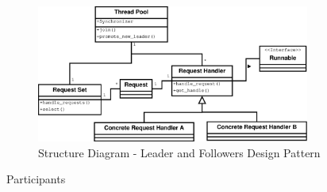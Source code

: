 \begin{figure}
	\centering
	\includegraphics*[width=0.8\textwidth, keepaspectratio=false]{fig/image16.eps}
	\caption{Structure Diagram - Leader and Followers Design Pattern}
	\label{fig:str_diagram_lf}
\end{figure}

\begin{description}
	\item[Participants]
\end{description}

